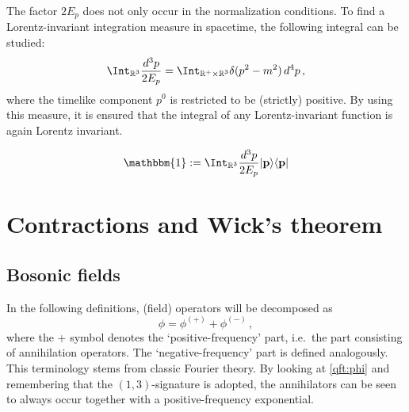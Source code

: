     The factor $2E_p$ does not only occur in the normalization conditions. To find a Lorentz-invariant integration measure in spacetime, the following integral can be studied:
    \begin{gather}
        \Int_{\mathbb{R}^3}\frac{d^3p}{2E_p} = \Int_{\mathbb{R}^+\times\mathbb{R}^3}\delta(p^2-m^2)\,d^4p\,,
    \end{gather}
    where the timelike component $p^0$ is restricted to be (strictly) positive. By using this measure, it is ensured that the integral of any Lorentz-invariant function is again Lorentz invariant.
    \begin{example}
        \begin{gather}
            \mathbbm{1} := \Int_{\mathbb{R}^3}\frac{d^3p}{2E_p}|\mathbf{p}\rangle\langle\mathbf{p}|
        \end{gather}
    \end{example}

\section{Contractions and Wick's theorem}
\subsection{Bosonic fields}

    In the following definitions, (field) operators will be decomposed as \[\phi = \phi^{(+)} + \phi^{(-)}\,,\] where the + symbol denotes the `positive-frequency' part, i.e.~the part consisting of annihilation operators. The `negative-frequency' part is defined analogously. This terminology stems from classic Fourier theory. By looking at \cref{qft:phi} and remembering that the $(1,3)$-signature is adopted, the annihilators can be seen to always occur together with a positive-frequency exponential.



